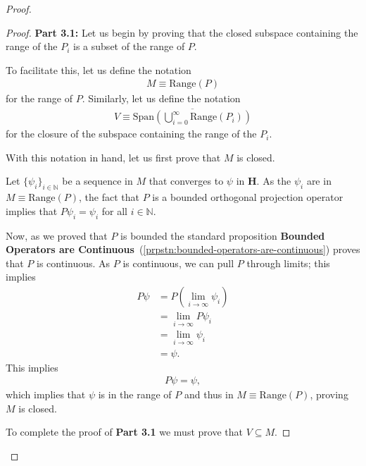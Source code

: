 \begin{proof}
\begin{proof}
\textbf{Part 3.1:} Let us begin by proving that the closed subspace containing the range of the $P_i$ is a subset of the range of $P$.

To facilitate this, let us define the notation
\begin{align}
    M \equiv \text{Range}(P)
\end{align}
for the range of $P$. Similarly, let us define the notation
\begin{align}
    V \equiv \overline{\text{Span} \left( \bigcup_{i = 0}^\infty \text{Range}(P_i) \right)}
\end{align}
for the closure of the subspace containing the range of the $P_i$.

With this notation in hand, let us first prove that $M$ is closed.

Let $\{ \psi_i \}_{i \in \mathbb{N}}$ be a sequence in $M$ that converges to $\psi$ in $\mathbf{H}$. As the $\psi_i$ are in $M \equiv \text{Range}(P)$, the fact that $P$ is a bounded orthogonal projection operator implies that $P\psi_i = \psi_i$ for all $i \in \mathbb{N}$.

Now, as we proved that $P$ is bounded the standard proposition \textbf{Bounded Operators are Continuous}~(\ref{prpstn:bounded-operators-are-continuous}) proves that $P$ is continuous. As $P$ is continuous, we can pull $P$ through limits; this implies
\begin{align}
    P\psi &= P \left( \lim_{i \rightarrow \infty} \psi_i \right) \\
          &= \lim_{i \rightarrow \infty} P \psi_i \\
          &= \lim_{i \rightarrow \infty} \psi_i \\
          &= \psi.
\end{align}
This implies
\begin{align}
    P\psi = \psi,
\end{align}
which implies that $\psi$ is in the range of $P$ and thus in $M \equiv \text{Range}(P)$, proving $M$ is closed.

To complete the proof of \textbf{Part 3.1} we must prove that $V \subseteq M$.


\end{proof}
\end{proof}
